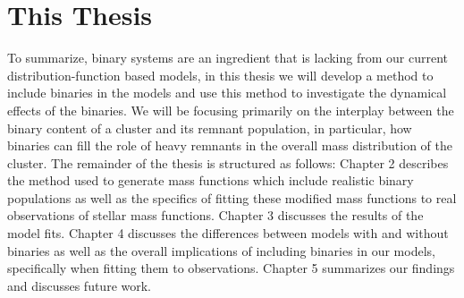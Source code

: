 \section{This Thesis}
To summarize, binary systems are an ingredient that is lacking from our current
distribution-function based models, in this thesis we will develop a method to include binaries in
the  models and use this method to investigate the dynamical effects of the binaries.
We will be focusing primarily on the interplay between the binary content of a cluster and its
remnant population, in particular, how binaries can fill the role of heavy remnants in the overall
mass distribution of the cluster. The remainder of the thesis is structured as follows: Chapter 2
describes the method used to generate mass functions which include realistic binary populations as
well as the specifics of fitting these modified mass functions to real observations of stellar mass
functions. Chapter 3 discusses the results of the model fits. Chapter 4 discusses the differences
between models with and without binaries as well as the overall implications of including binaries
in our models, specifically when fitting them to observations. Chapter 5 summarizes our findings and
discusses future work.



